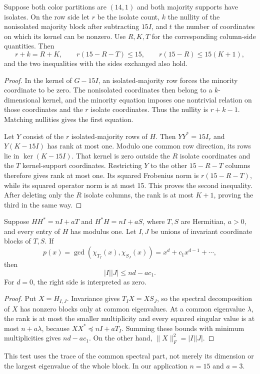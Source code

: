 \begin{lemma}\label{lem:mixed-rank}
Suppose both color partitions are $(14,1)$ and both majority supports have isolates. On the row side let $r$ be the isolate count, $k$ the nullity of the nonisolated majority block after subtracting $15I$, and $t$ the number of coordinates on which its kernel can be nonzero. Use $R,K,T$ for the corresponding column-side quantities. Then
\begin{equation}\label{eq:mixed-signature}
 r+k=R+K,\qquad r(15-R-T)\le15,\qquad
 r(15-R)\le15(K+1),
\end{equation}
and the two inequalities with the sides exchanged also hold.
\end{lemma}
\begin{proof}
In the kernel of $G-15I$, an isolated-majority row forces the minority coordinate to be zero. The nonisolated coordinates then belong to a $k$-dimensional kernel, and the minority equation imposes one nontrivial relation on those coordinates and the $r$ isolate coordinates. Thus the nullity is $r+k-1$. Matching nullities gives the first equation.

Let $Y$ consist of the $r$ isolated-majority rows of $H$. Then $YY^*=15I_r$ and $Y(K-15I)$ has rank at most one. Modulo one common row direction, its rows lie in $\ker(K-15I)$. That kernel is zero outside the $R$ isolate coordinates and the $T$ kernel-support coordinates. Restricting $Y$ to the other $15-R-T$ columns therefore gives rank at most one. Its squared Frobenius norm is $r(15-R-T)$, while its squared operator norm is at most 15. This proves the second inequality. After deleting only the $R$ isolate columns, the rank is at most $K+1$, proving the third in the same way.
\end{proof}

\begin{theorem}\label{thm:rectangle}
Suppose $HH^*=nI+aT$ and $H^*H=nI+aS$, where $T,S$ are Hermitian, $a>0$, and every entry of $H$ has modulus one. Let $I,J$ be unions of invariant coordinate blocks of $T,S$. If
\[
 p(x)=\gcd(\chi_{T_I}(x),\chi_{S_J}(x))
      =x^d+c_1x^{d-1}+\cdots,
\]
then
\begin{equation}\label{eq:rectangle}
 |I||J|\le nd-ac_1.
\end{equation}
For $d=0$, the right side is interpreted as zero.
\end{theorem}
\begin{proof}
Put $X=H_{I,J}$. Invariance gives $T_IX=XS_J$, so the spectral decomposition of $X$ has nonzero blocks only at common eigenvalues. At a common eigenvalue $\lambda$, the rank is at most the smaller multiplicity and every squared singular value is at most $n+a\lambda$, because $XX^*\preceq nI+aT_I$. Summing these bounds with minimum multiplicities gives $nd-ac_1$. On the other hand, $\|X\|_F^2=|I||J|$.
\end{proof}
This test uses the trace of the common spectral part, not merely its dimension or the largest eigenvalue of the whole block. In our application $n=15$ and $a=3$.
